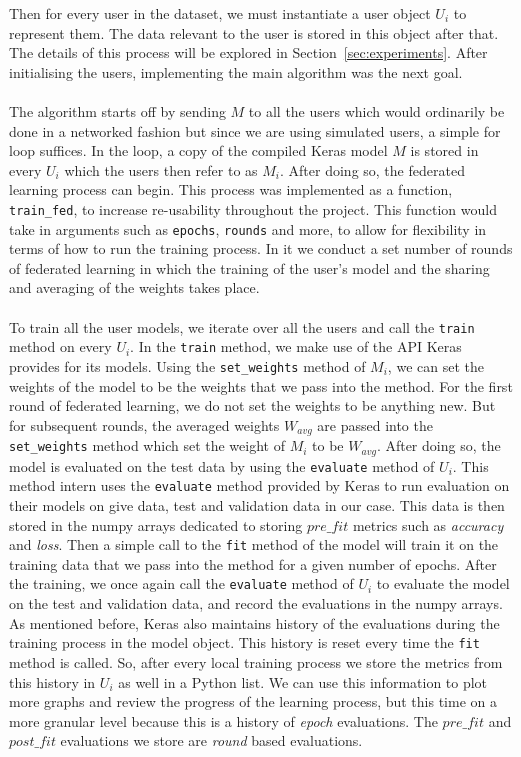 \documentclass[12pt]{article}
\begin{document}
\noindent Then for every user in the dataset, we must instantiate a user object $U_i$ to represent them. The data relevant to the user is stored in this object after that. The details of this process will be explored in Section~\ref{sec:experiments}. After initialising the users, implementing the main algorithm was the next goal. 
\\\\
The algorithm starts off by sending $M$ to all the users which would ordinarily be done in a networked fashion but since we are using simulated users, a simple for loop suffices. In the loop, a copy of the compiled Keras model $M$ is stored in every $U_i$ which the users then refer to as $M_i$. After doing so, the federated learning process can begin. This process was implemented as a function, \texttt{train\_fed}, to increase re-usability throughout the project. This function would take in arguments such as \texttt{epochs}, \texttt{rounds} and more, to allow for flexibility in terms of how to run the training process. In it we conduct a set number of rounds of federated learning in which the training of the user's model and the sharing and averaging of the weights takes place.
\\\\
To train all the user models, we iterate over all the users and call the \texttt{train} method on every $U_i$. In the \texttt{train} method, we make use of the API Keras provides for its models. Using the \texttt{set\_weights} method of $M_i$, we can set the weights of the model to be the weights that we pass into the method. For the first round of federated learning, we do not set the weights to be anything new. But for subsequent rounds, the averaged weights $W_{avg}$ are passed into the \texttt{set\_weights} method which set the weight of $M_i$ to be $W_{avg}$. After doing so, the model is evaluated on the test data by using the \texttt{evaluate} method of $U_i$. This method intern uses the \texttt{evaluate} method provided by Keras to run evaluation on their models on give data, test and validation data in our case. This data is then stored in the numpy arrays dedicated to storing $pre\_fit$ metrics such as \textit{accuracy} and \textit{loss}. Then a simple call to the \texttt{fit} method of the model will train it on the training data that we pass into the method for a given number of epochs. After the training, we once again call the \texttt{evaluate} method of $U_i$ to evaluate the model on the test and validation data, and record the evaluations in the numpy arrays. As mentioned before, Keras also maintains history of the evaluations during the training process in the model object. This history is reset every time the \texttt{fit} method is called. So, after every local training process we store the metrics from this history in $U_i$ as well in a Python list. We can use this information to plot more graphs and review the progress of the learning process, but this time on a more granular level because this is a history of \textit{epoch} evaluations. The $pre\_fit$ and $post\_fit$ evaluations we store are \textit{round} based evaluations.
\end{document}
